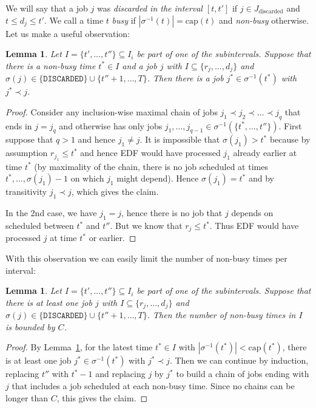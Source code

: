 \documentclass[11pt,letterpaper,oneside,english]{article}
\theoremstyle{theorem}
\newtheorem{lemma}[theorem]{Lemma}
\begin{document}
We will say that a job $j$ was \emph{discarded in the interval $[t,t']$}
if $j \in J_{\textrm{discarded}}$ and
$t \leq d_j \leq t'$. We call a time $t$ \emph{busy} if
$|\sigma^{-1}(t)| = \textrm{cap}(t)$ and \emph{non-busy} otherwise.
Let us make a useful observation:
\begin{lemma} \label{lem:dep-discarded-job-to-nonbusy-time}
Let $I=\{t',\ldots,t''\} \subseteq I_i$ be part of one of the subintervals. Suppose that there is a non-busy time $t^* \in I$
and a job $j$ with $I \subseteq \{r_j,\ldots,d_j\}$ and $\sigma(j) \in \{
\texttt{DISCARDED} \} \cup \{ t''+1,\ldots,T\}$. Then there is a job
$j^* \in \sigma^{-1}(t^*)$
with $j^* \prec j$.
\end{lemma}
\begin{proof}
Consider any inclusion-wise maximal chain of jobs $j_1 \prec j_2 \prec
\ldots \prec j_q$ that
ends in $j = j_q$ and otherwise has only jobs $j_1,\ldots,j_{q-1} \in
\sigma^{-1}(\{t^*,\ldots,t''\})$.
First suppose that $q>1$ and hence $j_1 \neq j$.
It is impossible that $\sigma(j_1) > t^*$ because by assumption $r_{j_1}
\leq t^*$ and hence
EDF would have processed $j_1$ already earlier at time $t^*$ (by
maximality of the chain, there is
no job scheduled at times $t^*,\ldots,\sigma(j_1)-1$ on which $j_1$
might depend).
Hence  $\sigma(j_1) = t^*$ and by transitivity $j_1 \prec j$, which
gives the claim.

In the 2nd case, we have $j_1 = j$, hence there is no job that $j$
depends on scheduled between $t^*$ and $t''$.
But we know that $r_{j} \leq t^*$. Thus EDF would have processed $j$ at time $t^*$ or earlier.
\end{proof}



With this observation we can easily limit the number of non-busy times
per interval:

\begin{lemma} \label{lem:Bound-on-num-nonbusy-times}
Let $I = \{ t',\ldots,t''\} \subseteq I_i$ be part of one of the subintervals. Suppose that there is at least one job $j$ with $I \subseteq \{r_j,\ldots,d_j\}$ and $\sigma(j) \in \{
\texttt{DISCARDED}\} \cup \{ t''+1,\ldots,T\}$.
Then the number of non-busy times in $I$ is bounded by $C$.
\end{lemma}
\begin{proof}
By Lemma~\ref{lem:dep-discarded-job-to-nonbusy-time}, for the latest time $t^*
\in I$
with $|\sigma^{-1}(t^*)| < \textrm{cap}(t^*)$, there is at least one job $j^*
\in \sigma^{-1}(t^*)$ with $j^* \prec j$. 
Then we can continue by induction, replacing $t''$ with $t^*-1$ and replacing $j$ by $j^*$
to build a chain of jobs ending with $j$ that includes a job scheduled at each non-busy time.
Since no chains can be longer than $C$, this gives the claim.
\end{proof}
\end{document}
